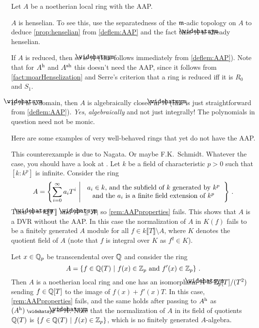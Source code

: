 \documentclass[a4paper, 10pt, oneside, DIV=9, chapterprefix=true, numbers=enddot, bibliography=totoc]{scrbook}
\begin{document}
\begin{rem}\label{rem:AAPproperties}
	Let $A$ be a noetherian local ring with the AAP.
	\begin{alphanumerate}
		\item $A$ is henselian. To see this, use the separatedness of the $\mathfrak{m}$-adic topology on $A$ to deduce \cref{prop:henselian} from \cref{deflem:AAP} and the fact that $\roof{A}$ is already henselian.
		\item If $A$ is reduced, then so is $\roof{A}$ (this follows immediately from \cref{deflem:AAP}). Note that for $A^{\mathrm{h}}$ and $A^{\mathrm{sh}}$ this doesn't need the AAP, since it follows from \cref{fact:moarHenselization} and Serre's criterion that a ring is reduced iff it is $R_0$ and $S_1$.
		\item If $\roof{A}$ is a domain, then $A$ is algebraically closed in $\roof{A}$ (this is just straightforward from \cref{deflem:AAP}). \emph{Yes}, \emph{algebraically} and not just integrally! The polynomials in question need not be monic.
	\end{alphanumerate}
\end{rem}
\begin{exm}
	Here are some examples of very well-behaved rings that yet do not have the AAP.
	\begin{alphanumerate}
		\item This counterexample is due to Nagata. Or maybe F.K.\ Schmidt. Whatever the case, you should have a look at \cite{BGR}. Let $k$ be a field of characteristic $p>0$ such that $[k:k^p]$ is infinite. Consider the ring
		\begin{equation*}
			A=\left\{\sum_{i=0}^\infty a_iT^i\st
			\begin{tabular}{c}
				$a_i\in k$, and the subfield of $k$ generated by $k^p$\\
				and the $a_i$ is a finite field extension of $k^p$
			\end{tabular}\right\}\,.
		\end{equation*}
		Then $\roof{A}=k\llbracket T\rrbracket$ and $\roof{A}^p\subseteq A$, so \cref{rem:AAPproperties} fails. This shows that $A$ is a DVR without the AAP. In this case the normalization of $A$ in $K(f)$ fails to be a finitely generated $A$ module for all $f\in k\llbracket T\rrbracket\setminus A$, where $K$ denotes the quotient field of $A$ (note that $f$ is integral over $K$ as $f^q\in K$).
		\item Let $x\in \mathbb{Q}_p$ be transcendental over $\mathbb{Q}$ and consider the ring
		\begin{equation*}
			A=\left\{f\in\mathbb{Q}(T)\ \middle|\  f(x)\in\mathbb{Z}_p\text{ and }f'(x)\in\mathbb{Z}_p\right\}\,.
		\end{equation*}
		Then $A$ is a noetherian local ring and one has an isomorphism $\roof{A}\cong \IZ_p[T]/(T^2)$ sending $f\in \mathbb{Q}[T]$ to the image of $f(x)+f'(x)T$. In this case, \cref{rem:AAPproperties} fails, and the same holds after passing to $A^{\mathrm{h}}$ as $(A^\h)^\complete\cong \roof{A}$. Note that the normalization of $A$ in its field of quotients $\mathbb{Q}(T)$ is $\left\{f\in\mathbb{Q}(T)\ \middle|\  f(x)\in\mathbb{Z}_p\right\}$, which is no finitely generated $A$-algebra.
	\end{alphanumerate}
\end{exm}
\end{document}
